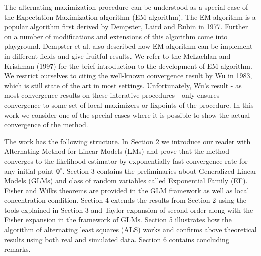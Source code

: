 The alternating maximization procedure can be understood as a special case of the Expectation Maximization algorithm (EM algorithm). The EM algorithm is a popular algorithm first derived by Dempster, Laird and Rubin  in 1977. Further on a number of modifications and extensions of this algorithm come into playground. Dempster et al. also described how EM algorithm can be implement in different fields and give fruitful results. We refer to the McLachlan and Krishman (1997) for the brief introduction to the development of EM algorithm. We restrict ourselves to citing the well-known convergence result by Wu in 1983, which is still state of the art in most settings. Unfortunately, Wu's result - as most convergence results on these interative procedures - only ensures convergence to some set of local maximizers or fixpoints of the procedure. In this work we consider one of the special cases where it is possible to show the actual convergence of the method. 

The work has the following structure. In Section 2 we introduce our reader with Alternating Method for Linear Models (LMs) and prove that the method converges to the likelihood estimator by exponentially fast convergence rate for any initial point $\bm{\theta}^{\circ}$. Section 3 contains the preliminaries about Generalized Linear Models (GLMs) and class of random variables called Exponential Family (EF). Fisher and Wilks theorems are provided in the GLM framework as well as local concentration condition. Section 4 extends the results from Section 2 using the tools explained in Section 3 and Taylor expansion of second order along with the Fisher expansion in the framework of GLMs.  Section 5 illustrates how the algorithm of alternating least squares (ALS) works and confirms above theoretical results using both real and simulated data. Section 6 contains concluding remarks. 

